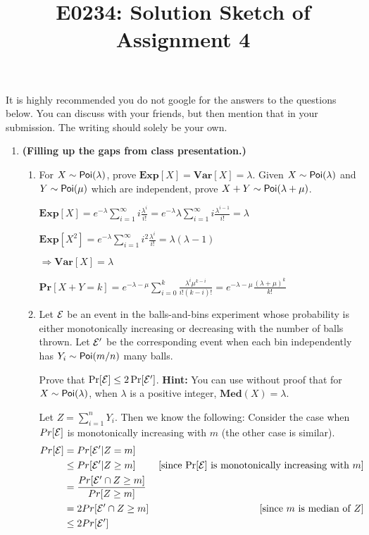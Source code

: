 \documentclass[11pt]{article}
\def\Poi{{\sf Poi}}
\begin{document}
\title{E0234: Solution Sketch of Assignment 4}
\author{}
\date{}
\maketitle
It is highly recommended you do not google for the answers to the questions below. You can discuss with your friends, but then mention that in your submission.
The writing should solely be your own.

\begin{enumerate}
\item  {\bf (Filling up the gaps from class presentation.)}
\begin{enumerate}
\item For $X \sim \Poi(\lambda)$, prove $\mathbf{Exp}[X] = \mathbf{Var}[X] = \lambda$. Given $X\sim\Poi(\lambda)$ and $Y\sim \Poi(\mu)$ which are independent, prove
$X+Y \sim \Poi(\lambda+\mu)$.

\Sol 

$\mathbf{Exp}[X] = e^{-\lambda} \sum_{i=1}^\infty i \frac{\lambda^i}{i!} = e^{-\lambda} \lambda \sum_{i=1}^\infty i \frac{\lambda^{i-1}}{i!} = \lambda$

$\mathbf{Exp}[X^2] = e^{-\lambda} \sum_{i=1}^\infty i^2 \frac{\lambda^i}{i!} = \lambda(\lambda-1) $

$\Rightarrow \mathbf{Var}[X] = \lambda$

$\mathbf{Pr}[X+Y = k] = e^{-\lambda-\mu} \sum_{i=0}^k \frac{\lambda^i \mu^{k-i}}{i! (k-i)!} = e^{-\lambda-\mu} \frac{(\lambda+\mu)^k}{k!}$

\item  Let ${\cal E}$ be an event in the balls-and-bins experiment whose probability is either monotonically increasing or decreasing with the number of balls thrown. 
Let ${\cal E}'$ be the corresponding event when each bin independently has $Y_i \sim \Poi(m/n)$ many balls.

Prove that $\Pr[{\cal E}] \leq 2\Pr[{\cal E}']$. {\bf Hint:} You can use without proof that for $X\sim \Poi(\lambda)$, when $\lambda$ is a positive integer, $\mathbf{Med}(X) = \lambda$.

\Sol

Let $Z = \sum_{i=1}^n Y_i$. Then we know the following:
Consider the case when $Pr[{\cal E}]$ is monotonically increasing with $m$ (the other case is similar).
\begin{align*}
 Pr[{\cal E}] &= Pr[{\cal E}' | Z=m] &\\
 &\le Pr[{\cal E}' | Z\ge m] &\text{[since Pr[${\cal E}$] is monotonically increasing with $m$]}\\
 &= \frac{Pr[{\cal E}' \cap Z\ge m]}{Pr[Z\ge m]} &\\
 &= 2 Pr[{\cal E}' \cap Z\ge m] &\text{[since $m$ is median of $Z$]}\\
 &\le 2Pr[{\cal E}']&
\end{align*}



\end{enumerate}
\end{enumerate}
\end{document}
